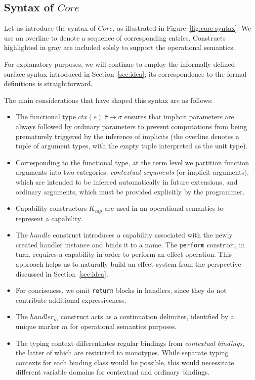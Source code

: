 \documentclass[acmsmall,review,screen]{acmart}
\newcommand{\ctx}[1]{ctx\left(#1\right)~}
\begin{document}
\subsection{Syntax of $Core$} \label{subsec:syntax-core}

Let us introduce the syntax of $Core$, as illustrated in Figure~\ref{fig:core-syntax}.
We use an overline to denote a sequence of corresponding entries.
Constructs highlighted in gray are included solely to support the operational semantics.

For explanatory purposes, we will continue to employ the informally defined surface syntax introduced in Section~\ref{sec:idea}; its correspondence to the formal definitions is straightforward.

The main considerations that have shaped this syntax are as follows:
\begin{itemize}
    \item The functional type $\ctx{e}\overline{\tau}\to\sigma$ ensures that implicit parameters are always followed by ordinary parameters to prevent computations from being prematurely triggered by the inference of implicits (the overline denotes a tuple of argument types, with the empty tuple interpreted as the unit type).
    \item Corresponding to the functional type, at the term level we partition function arguments into two categories: \emph{contextual arguments} (or implicit arguments), which are intended to be inferred automatically in future extensions, and ordinary arguments, which must be provided explicitly by the programmer.
    \item Capability constructors $K_{cap}$ are used in an operational semantics to represent a capability.
    \item  The $handle$ construct introduces a capability associated with the newly created handler instance and binds it to a name.
    The \texttt{perform} construct, in turn, requires a capability in order to perform an effect operation.
    This approach helps us to naturally build an effect system from the perspective discussed in Section~\ref{sec:idea}.
    \item For conciseness, we omit \texttt{return} blocks in handlers, since they do not contribute additional expressiveness.
    \item The $handler_m$ construct acts as a continuation delimiter, identified by a unique marker $m$ for operational semantics purposes.
    \item The typing context differentiates regular bindings from \emph{contextual bindings}, the latter of which are restricted to monotypes.
    While separate typing contexts for each binding class would be possible, this would necessitate different variable domains for contextual and ordinary bindings.
\end{itemize}
\end{document}
